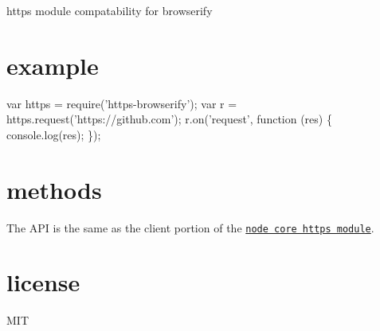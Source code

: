 https module compatability for browserify

\section*{example}


\begin{DoxyCode}
var https = require('https-browserify');
var r = https.request('https://github.com');
r.on('request', function (res) \{
    console.log(res);
\});
\end{DoxyCode}


\section*{methods}

The A\+PI is the same as the client portion of the \href{http://nodejs.org/docs/latest/api/https.html}{\tt node core https module}.

\section*{license}

M\+IT 